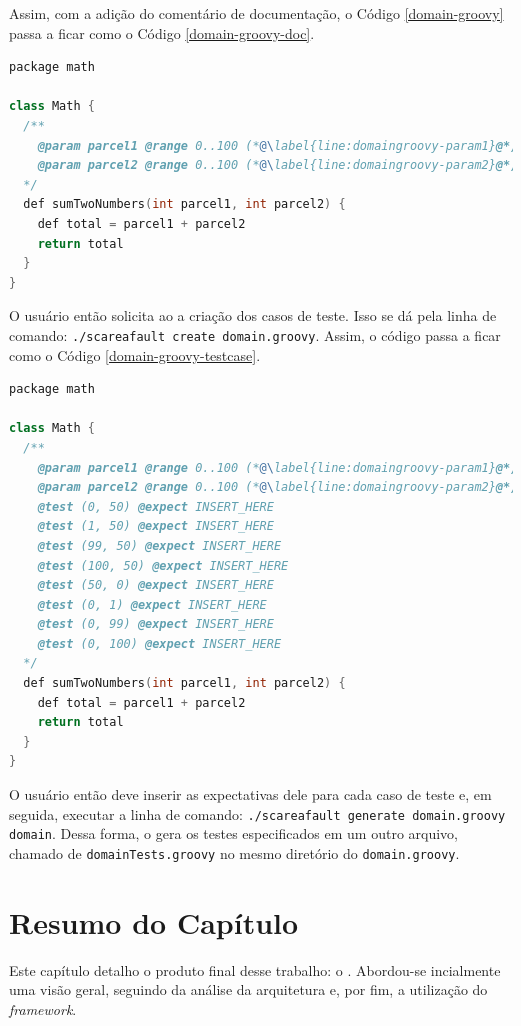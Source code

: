 Assim, com a adição do comentário de documentação, o Código \ref{domain-groovy}
passa a ficar como o Código \ref{domain-groovy-doc}.
\begin{lstlisting}[language=C++, label=domain-groovy-doc, caption=Código do arquivo domain.groovy com as marcações do \scarefault]
package math

class Math {
  /**
    @param parcel1 @range 0..100 (*@\label{line:domaingroovy-param1}@*)
    @param parcel2 @range 0..100 (*@\label{line:domaingroovy-param2}@*)
  */
  def sumTwoNumbers(int parcel1, int parcel2) {
    def total = parcel1 + parcel2
    return total
  }
}
\end{lstlisting}

O usuário então solicita ao \scarefault a criação dos casos de teste.
Isso se dá pela linha de comando:
\lstinline|./scareafault create domain.groovy|. Assim,
o código passa a ficar como o Código \ref{domain-groovy-testcase}.
\begin{lstlisting}[language=C++, label=domain-groovy-testcase, caption=Código do arquivo domain.groovy com os casos de teste]
package math

class Math {
  /**
    @param parcel1 @range 0..100 (*@\label{line:domaingroovy-param1}@*)
    @param parcel2 @range 0..100 (*@\label{line:domaingroovy-param2}@*)
    @test (0, 50) @expect INSERT_HERE
    @test (1, 50) @expect INSERT_HERE
    @test (99, 50) @expect INSERT_HERE
    @test (100, 50) @expect INSERT_HERE
    @test (50, 0) @expect INSERT_HERE
    @test (0, 1) @expect INSERT_HERE
    @test (0, 99) @expect INSERT_HERE
    @test (0, 100) @expect INSERT_HERE
  */
  def sumTwoNumbers(int parcel1, int parcel2) {
    def total = parcel1 + parcel2
    return total
  }
}
\end{lstlisting}

O usuário então deve inserir as expectativas dele para cada caso
de teste e, em seguida, executar a linha de comando:
\lstinline|./scareafault generate domain.groovy domain|.
Dessa forma, o \scarefault gera os testes especificados em um outro
arquivo, chamado de \lstinline|domainTests.groovy| no mesmo diretório
do \lstinline|domain.groovy|.

\section{Resumo do Capítulo}
  Este capítulo detalho o produto final desse trabalho: o \Scarefault. Abordou-se incialmente uma visão geral, seguindo da análise da arquitetura e, por fim, a utilização do \textit{framework}.